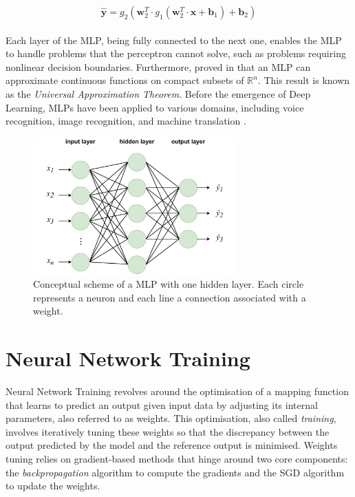 \begin{equation}
  \label{eqn:dlo:mlp}
  \hat{\mathbf{y}} = g_2(\mathbf{w}_2^T \cdot  g_1(\mathbf{w}_2^T \cdot \mathbf{x} + \mathbf{b}_1) + \mathbf{b}_2)
\end{equation}\\

Each layer of the \ac{MLP}, being fully connected to the next one, enables the
\ac{MLP} to handle problems that the perceptron cannot solve, such as problems
requiring nonlinear decision boundaries. Furthermore,
\citeauthor{cybenko1989approximation} proved in \cite{cybenko1989approximation}
that an \ac{MLP} can approximate continuous functions on compact subsets of
$\mathds{R}^n$. This result is known as the \emph{Universal Approximation
Theorem}. Before the emergence of Deep Learning, \acp{MLP} have been applied to
various domains, including voice recognition, image recognition, and machine
translation \cite{wasserman1988neural}.


\begin{figure}[htbp]
  \centering
  \includegraphics[width=0.7\textwidth]{chapter_dlo/assets/mlp_scheme.pdf}
  \caption{Conceptual scheme of a \ac{MLP} with one hidden layer. Each circle
  represents a neuron and each line a connection associated with a weight.}
  \label{fig:dlo:mlp}
\end{figure}

\section{Neural Network Training}\label{sec:dlo:training}

Neural Network Training revolves around the optimisation of a mapping function
that learns to predict an output given input data by adjusting its internal
parameters, also referred to as weights. This optimisation, also called
\emph{training}, involves iteratively tuning these weights so that the
discrepancy between the output predicted by the model and the reference output
is minimised. Weights tuning relies on gradient-based methods that hinge
around two core components: the \emph{backpropagation} algorithm to compute the
gradients and the \ac{SGD} algorithm to update the weights.

